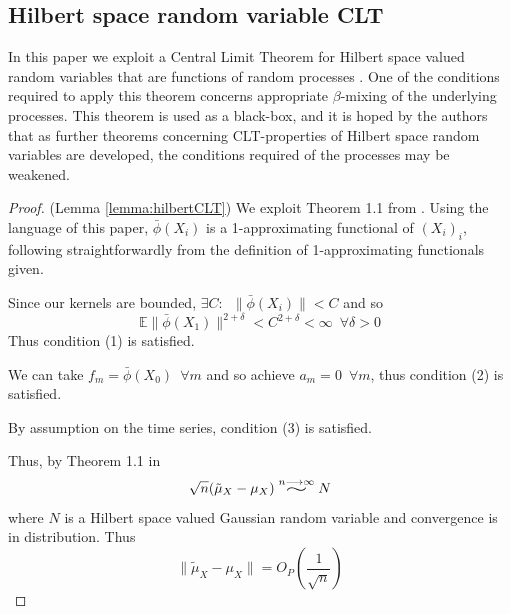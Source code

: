 \documentclass[]{article}
\newcommand{\widesim}[2][1.5]{
  \mathrel{\overset{#2}{\scalebox{#1}[1]{$\sim$}}}}
\begin{document}
\subsection{Hilbert space random variable CLT}\label{supp:hilbert-clt}

In this paper we exploit a Central Limit Theorem for Hilbert space valued random variables that are functions of random processes \citep{dehling2015bootstrap}. One of the conditions required to apply this theorem concerns appropriate $\beta$-mixing of the underlying processes. This theorem is used as a black-box, and it is hoped by the authors that as further theorems concerning CLT-properties of Hilbert space random variables are developed, the conditions required of the processes may be weakened.
\begin{proof}(Lemma \ref{lemma:hilbertCLT})
We exploit Theorem 1.1 from \citet{dehling2015bootstrap}. Using the language of this paper, $\bar{\phi}(X_i)$ is a 1-approximating functional of $(X_i)_i$, following straightforwardly from the definition of 1-approximating functionals given. 

Since our kernels are bounded, $\exists C: \enspace \|\bar{\phi}(X_i)\| < C $ and so \[\mathbb{E}\|\bar{\phi}(X_1)\|^{2+\delta} <C^{2+\delta}< \infty \enspace \forall \delta>0\]
Thus condition (1) is satisfied.

We can take $f_m = \bar{\phi}(X_0)\enspace \forall m$ and so achieve $a_m= 0 \enspace \forall m$, thus condition (2) is satisfied.

By assumption on the time series, condition (3) is satisfied.

Thus, by Theorem 1.1 in \citet{dehling2015bootstrap}
\[\sqrt{n} (\tilde{\mu}_{X} - \mu_{X}) \widesim[2]{n\longrightarrow\infty} N\]
where $N$ is a Hilbert space valued Gaussian random variable and convergence is in distribution. Thus 
\[\|\tilde{\mu}_{X} - \mu_{X}\| = O_P(\frac{1}{\sqrt{n}})\]
\end{proof}
\end{document}
